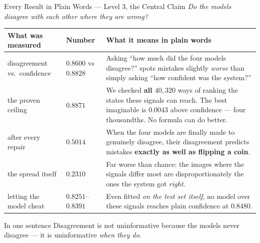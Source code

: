 \documentclass[aspectratio=169,11pt]{beamer}
\begin{document}
\begin{frame}{Every Result in Plain Words --- Level 3, the Central Claim}
\scriptsize
\emph{Do the models disagree with each other where they are wrong?}
\vspace{1mm}
\begin{center}
\tiny
\begin{tabular}{@{}p{2.7cm} l p{7.3cm}@{}}
\toprule
\textbf{What was measured} & \textbf{Number} & \textbf{What it means in plain words} \\
\midrule
disagreement vs.\ confidence & $0.8600$ vs $0.8828$ & Asking ``how much did the four models disagree?'' spots mistakes slightly \emph{worse} than simply asking ``how confident was the system?'' \\
\addlinespace
the proven ceiling & $0.8871$ & We checked \textbf{all $40{,}320$} ways of ranking the states these signals can reach. The best imaginable is $0.0043$ above confidence --- four thousandths. No formula can do better. \\
\addlinespace
after every repair & $0.5014$ & When the four models are finally made to genuinely disagree, their disagreement predicts mistakes \textbf{exactly as well as flipping a coin}. \\
\addlinespace
the spread itself & $0.2310$ & Far worse than chance: the images where the signals differ most are disproportionately the ones the system got \emph{right}. \\
\addlinespace
letting the model cheat & $0.8251$--$0.8391$ & Even fitted \emph{on the test set itself}, no model over these signals reaches plain confidence at $0.8480$. \\
\bottomrule
\end{tabular}
\end{center}
\vspace{-1mm}
\begin{alertblock}{\scriptsize In one sentence}
\scriptsize Disagreement is not uninformative because the models never disagree --- it is uninformative \emph{when they do}.
\end{alertblock}
\end{frame}
\end{document}
